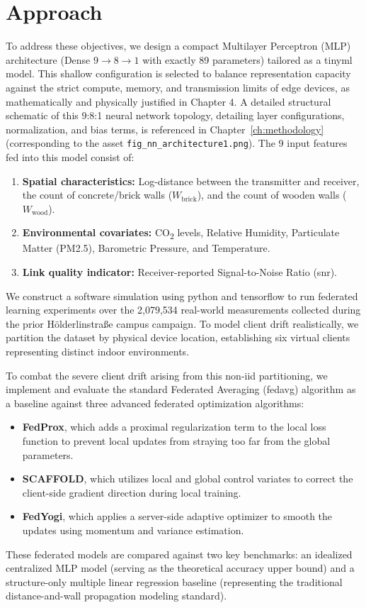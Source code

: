 \section{Approach}
\label{sec:approach}
To address these objectives, we design a compact Multilayer Perceptron (MLP) architecture (Dense $9 \to 8 \to 1$ with exactly 89 parameters) tailored as a \gls{tinyml} model. This shallow configuration is selected to balance representation capacity against the strict compute, memory, and transmission limits of edge devices, as mathematically and physically justified in Chapter 4. A detailed structural schematic of this 9:8:1 neural network topology, detailing layer configurations, normalization, and bias terms, is referenced in Chapter~\ref{ch:methodology} (corresponding to the asset \texttt{fig\_nn\_architecture1.png}). The 9 input features fed into this model consist of:
\begin{enumerate}
  \item \textbf{Spatial characteristics:} Log-distance between the transmitter and receiver, the count of concrete/brick walls (\(W_{\text{brick}}\)), and the count of wooden walls (\(W_{\text{wood}}\)).
  \item \textbf{Environmental covariates:} CO\textsubscript{2} levels, Relative Humidity, Particulate Matter (PM2.5), Barometric Pressure, and Temperature.
  \item \textbf{Link quality indicator:} Receiver-reported Signal-to-Noise Ratio (\gls{snr}).
\end{enumerate}

We construct a software simulation using python and tensorflow to run federated learning experiments over the 2,079,534 real-world measurements collected during the prior Hölderlinstraße campus campaign. To model client drift realistically, we partition the dataset by physical device location, establishing six virtual clients representing distinct indoor environments.

To combat the severe client drift arising from this non-\gls{iid} partitioning, we implement and evaluate the standard Federated Averaging (\gls{fedavg}) algorithm as a baseline against three advanced federated optimization algorithms:
\begin{itemize}
  \item \textbf{FedProx}, which adds a proximal regularization term to the local loss function to prevent local updates from straying too far from the global parameters.
  \item \textbf{SCAFFOLD}, which utilizes local and global control variates to correct the client-side gradient direction during local training.
  \item \textbf{FedYogi}, which applies a server-side adaptive optimizer to smooth the updates using momentum and variance estimation.
\end{itemize}
These federated models are compared against two key benchmarks: an idealized centralized MLP model (serving as the theoretical accuracy upper bound) and a structure-only multiple linear regression baseline (representing the traditional distance-and-wall propagation modeling standard).

